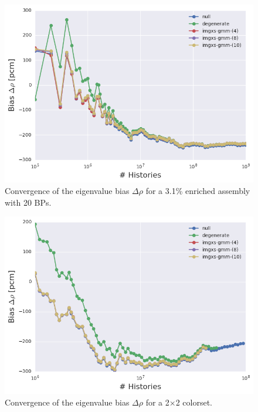 \clearpage

\begin{figure}[h!]
\centering
\includegraphics[width=0.87\linewidth]{figures/results/convergence/assm-31-20BPs/keff-bias-evo}
\vspace{2mm}
\caption[Eigenvalue bias covergence for a 3.1\% enriched assembly with 20 \acp{BP}]{Convergence of the eigenvalue bias $\Delta\rho$ for a 3.1\% enriched assembly with 20 \acp{BP}.}
\label{fig:chap11-assm-3.1-20BPs-eigenvalue-converge}
\end{figure}

\begin{figure}[h!]
\centering
\includegraphics[width=0.87\linewidth]{figures/results/convergence/2x2/keff-bias-evo}
\vspace{2mm}
\caption[Eigenvalue bias covergence for a 2$\times$2 colorset]{Convergence of the eigenvalue bias $\Delta\rho$ for a 2$\times$2 colorset.}
\label{fig:chap11-2x2-eigenvalue-converge}
\end{figure}

